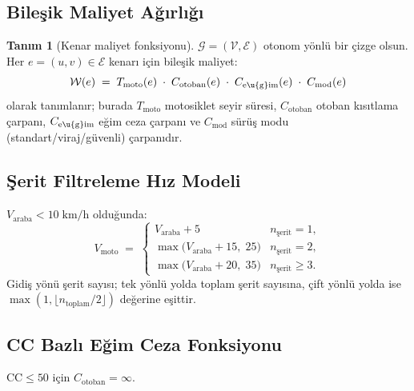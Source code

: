 \documentclass[11pt,a4paper]{article}
\newcommand{\WW}{\mathcal{W}}
\newcommand{\GG}{\mathcal{G}}
\newcommand{\EE}{\mathcal{E}}
\newcommand{\VV}{\mathcal{V}}
\newcommand{\CC}{\mathrm{CC}}
\theoremstyle{definition}
\newtheorem{definition}{Tan{\i}m}[section]
\begin{document}
\subsection{Bile\c{s}ik Maliyet A\u{g}{\i}rl{\i}\u{g}{\i}}

\begin{definition}[Kenar maliyet fonksiyonu]
$\GG=(\VV,\EE)$ otonom y\"onl\"u bir \c{c}izge olsun. Her $e=(u,v)\in\EE$
kenar{\i} i\c{c}in bileşik maliyet:
\begin{equation}\label{eq:cost}
  \WW(e)
  \;=\;
  T_{\mathrm{moto}}(e)
  \;\cdot\;
  C_{\mathrm{otoban}}(e)
  \;\cdot\;
  C_{\mathrm{e\u{g}im}}(e)
  \;\cdot\;
  C_{\mathrm{mod}}(e)
\end{equation}
olarak tan{\i}mlan{\i}r; burada
$T_{\mathrm{moto}}$ motosiklet seyir s\"uresi,
$C_{\mathrm{otoban}}$ otoban k{\i}s{\i}tlama \c{c}arpan{\i},
$C_{\mathrm{e\u{g}im}}$ e\u{g}im ceza \c{c}arpan{\i} ve
$C_{\mathrm{mod}}$ s\"ur\"u\c{s} modu (standart/viraj/g\"uvenli)
\c{c}arpan{\i}d{\i}r.
\end{definition}

\subsection{\c{S}erit Filtreleme H{\i}z Modeli}

$V_{\mathrm{araba}} < 10\;\mathrm{km/h}$ oldu\u{g}unda:
\begin{equation}\label{eq:filter}
  V_{\mathrm{moto}}
  \;=\;
  \begin{cases}
    V_{\mathrm{araba}} + 5
      & n_{\text{şerit}} = 1,\\[4pt]
    \max\!\big(V_{\mathrm{araba}} + 15,\; 25\big)
      & n_{\text{şerit}} = 2,\\[4pt]
    \max\!\big(V_{\mathrm{araba}} + 20,\; 35\big)
      & n_{\text{şerit}} \ge 3.
  \end{cases}
\end{equation}
Gidi\c{s} y\"on\"u \c{s}erit say{\i}s{\i}; tek y\"onl\"u yolda
toplam \c{s}erit say{\i}s{\i}na, \c{c}ift y\"onl\"u yolda ise
$\max(1,\lfloor n_{\text{toplam}}/2\rfloor)$ de\u{g}erine e\c{s}ittir.

\subsection{CC Bazl{\i} E\u{g}im Ceza Fonksiyonu}

$\CC\le 50$ i\c{c}in $C_{\mathrm{otoban}}=\infty$.
\end{document}
